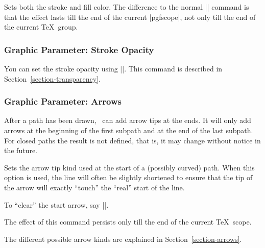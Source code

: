 \begin{command}{\pgfsetcolor{}}
  Sets both the stroke and fill color. The difference to the normal
  |\color| command is that the effect lasts till the end of the
  current |{pgfscope}|, not only till the end of the current \TeX\
  group. 
\end{command}


\subsubsection{Graphic Parameter: Stroke Opacity}

You can set the stroke opacity using |\pgfsetstrokeopacity|. This
command is described in Section~\ref{section-transparency}.

\subsubsection{Graphic Parameter: Arrows}

After a path has been drawn, \pgfname\ can add arrow tips at the
ends. It will only add arrows at the beginning of the first subpath
and at the end of the last subpath. For closed paths the result is not
defined, that is, it may change without notice in the future. 

\begin{command}{\pgfsetarrowsstart{}}
  Sets the arrow tip kind used at the start of a (possibly curved)
  path. When this option is used, the line will often be slightly
  shortened to ensure that the tip of the arrow will exactly ``touch''
  the ``real'' start of the line.

  To ``clear'' the start arrow, say |\pgfsetarrowsstart{}|.
\begin{codeexample}[]
\begin{pgfpicture}
  \pgfpathmoveto{\pgfpointorigin}
  \pgfpathlineto{\pgfpoint{1cm}{0cm}}
  \pgfpathmoveto{\pgfpoint{0cm}{2mm}}
  \pgfpathlineto{\pgfpoint{1cm}{2mm}}
\end{pgfpicture}
\end{codeexample}

  The effect of this command persists only till the end of the current
  \TeX\ scope.

  The different possible arrow kinds are explained in
  Section~\ref{section-arrows}.  
\end{command}

